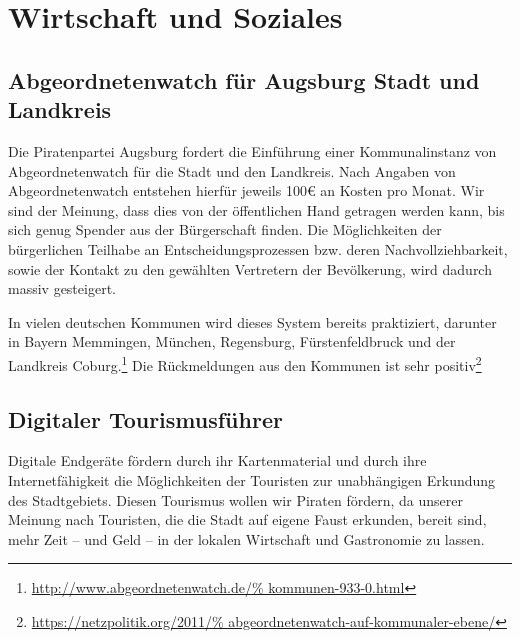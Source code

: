 \chapter{Wirtschaft und Soziales}

  \section{Abgeordnetenwatch für Augsburg Stadt und Landkreis}
  
  Die Piratenpartei Augsburg fordert die Einführung einer Kommunalinstanz von 
  Abgeordnetenwatch für die Stadt und den Landkreis. Nach Angaben von 
  Abgeordnetenwatch entstehen hierfür jeweils 100€ an Kosten pro Monat. Wir 
  sind der Meinung, dass dies von der öffentlichen Hand getragen werden kann, 
  bis sich genug Spender aus der Bürgerschaft finden. Die Möglichkeiten der 
  bürgerlichen Teilhabe an Entscheidungsprozessen bzw. deren 
  Nachvollziehbarkeit, sowie der Kontakt zu den gewählten Vertretern der 
  Bevölkerung, wird dadurch massiv gesteigert. 
  
  In vielen deutschen Kommunen wird dieses System bereits praktiziert, 
  darunter in Bayern Memmingen, München, Regensburg, Fürstenfeldbruck und der 
  Landkreis Coburg.\footnote{\url{http://www.abgeordnetenwatch.de/%
  kommunen-933-0.html}} Die Rückmeldungen aus den Kommunen ist sehr 
  positiv\footnote{\url{https://netzpolitik.org/2011/%
  abgeordnetenwatch-auf-kommunaler-ebene/}}
  
  \section{Digitaler Tourismusführer}
  
  Digitale Endgeräte fördern durch ihr Kartenmaterial und durch ihre 
  Internetfähigkeit die Möglichkeiten der Touristen zur unabhängigen Erkundung 
  des Stadtgebiets. Diesen Tourismus wollen wir Piraten fördern, da unserer 
  Meinung nach Touristen, die die Stadt auf eigene Faust erkunden, bereit 
  sind, mehr Zeit -- und Geld -- in der lokalen Wirtschaft und Gastronomie zu 
  lassen.
  
